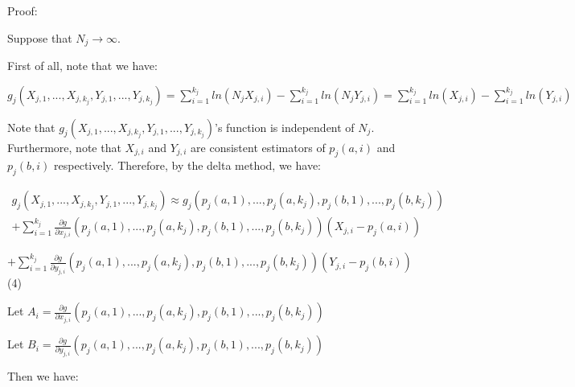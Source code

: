 \documentclass{article}
\begin{document}
Proof:

Suppose that $\displaystyle N_{j}\rightarrow \infty $.

First of all, note that we have:

$\displaystyle g_{j}\left( X_{j,1} ,...,X_{j,k_{j}} ,Y_{j,1} ,...,Y_{j,k_{j}}\right) =\sum _{i=1}^{k_{j}} ln\left( N_{j} X_{j,i}\right) -\sum _{i=1}^{k_{j}} ln\left( N_{j} Y_{j,i}\right) =\sum _{i=1}^{k_{j}} ln\left( X_{j,i}\right) -\sum _{i=1}^{k_{j}} ln\left( Y_{j,i}\right)$

Note that $\displaystyle g_{j}\left( X_{j,1} ,...,X_{j,k_{j}} ,Y_{j,1} ,...,Y_{j,k_{j}}\right)$'s function is independent of $\displaystyle N_{j}$. Furthermore, note that $\displaystyle X_{j,i}$ and $\displaystyle Y_{j,i}$ are consistent estimators of $\displaystyle p_{j}\left( a,i\right)$ and $\displaystyle p_{j}\left( b,i\right)$ respectively. Therefore, by the delta method, we have:

$\displaystyle  \begin{array}{l}
g_{j}\left( X_{j,1} ,...,X_{j,k_{j}} ,Y_{j,1} ,...,Y_{j,k_{j}}\right) \approx g_{j}\left( p_{j}\left( a,1\right) ,...,p_{j}\left( a,k_{j}\right) ,p_{j}\left( b,1\right) ,...,p_{j}\left( b,k_{j}\right)\right)\\
+\sum _{i=1}^{k_{j}}\frac{\partial g}{\partial x_{j,i}}\left( p_{j}\left( a,1\right) ,...,p_{j}\left( a,k_{j}\right) ,p_{j}\left( b,1\right) ,...,p_{j}\left( b,k_{j}\right)\right)\left( X_{j,i} -p_{j}\left( a,i\right)\right)
\end{array}$

$\displaystyle +\sum _{i=1}^{k_{j}}\frac{\partial g}{\partial y_{j,i}}\left( p_{j}\left( a,1\right) ,...,p_{j}\left( a,k_{j}\right) ,p_{j}\left( b,1\right) ,...,p_{j}\left( b,k_{j}\right)\right)\left( Y_{j,i} -p_{j}\left( b,i\right)\right)$ (4)



Let $\displaystyle A_{i} =\frac{\partial g}{\partial x_{j,i}}\left( p_{j}\left( a,1\right) ,...,p_{j}\left( a,k_{j}\right) ,p_{j}\left( b,1\right) ,...,p_{j}\left( b,k_{j}\right)\right)$

Let $\displaystyle B_{i} =\frac{\partial g}{\partial y_{j,i}}\left( p_{j}\left( a,1\right) ,...,p_{j}\left( a,k_{j}\right) ,p_{j}\left( b,1\right) ,...,p_{j}\left( b,k_{j}\right)\right)$



Then we have:
\end{document}
